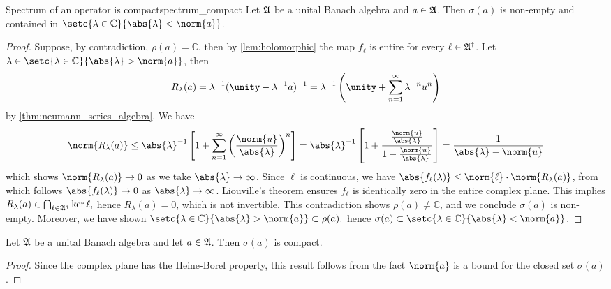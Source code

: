 \begin{theorem}{Spectrum of an operator is compact}{spectrum_compact}
    Let \(\mathfrak{A}\) be a unital Banach algebra and \(a \in \mathfrak{A}\). Then \(\sigma(a)\) is non-empty and contained in \(\setc{\lambda \in \mathbb{C}}{\abs{\lambda} < \norm{a}}\).
\end{theorem}
\begin{proof}
    Suppose, by contradiction, \(\rho(a) = \mathbb{C}\), then by \cref{lem:holomorphic} the map \(f_\ell\) is entire for every \(\ell \in \mathfrak{A}^\dag\). Let \(\lambda \in \setc{\lambda \in \mathbb{C}}{\abs{\lambda} > \norm{a}}\), then
    \begin{equation*}
        R_{\lambda}(a) = \lambda^{-1}(\unity - \lambda^{-1}a)^{-1} = \lambda^{-1}\left(\unity + \sum_{n = 1}^{\infty} \lambda^{-n}u^n\right)
    \end{equation*}
    by \cref{thm:neumann_series_algebra}. We have
    \begin{equation*}
        \norm{R_{\lambda}(a)} \leq \abs{\lambda}^{-1}\left[1 + \sum_{n = 1}^\infty \left(\frac{\norm{u}}{\abs{\lambda}}\right)^n\right] = \abs{\lambda}^{-1} \left[1 + \frac{\frac{\norm{u}}{\abs{\lambda}}}{1 - \frac{\norm{u}}{\abs{\lambda}}}\right] = \frac{1}{\abs{\lambda} - \norm{u}}
    \end{equation*}
    which shows \(\norm{R_{\lambda}(a)} \to 0\) as we take \(\abs{\lambda} \to \infty\). Since \(\ell\) is continuous, we have \(\abs{f_\ell(\lambda)} \leq \norm{\ell}\cdot \norm{R_{\lambda}(a)}\), from which follows \(\abs{f_\ell(\lambda)} \to 0\) as \(\abs{\lambda} \to \infty\). Liouville's theorem ensures \(f_\ell\) is identically zero in the entire complex plane. This implies \(R_\lambda(a) \in \bigcap_{\ell \in \mathfrak{A}^\dag}\ker{\ell},\) hence \(R_{\lambda}(a) = 0\), which is not invertible. This contradiction shows \(\rho(a) \neq \mathbb{C}\), and we conclude \(\sigma(a)\) is non-empty. Moreover, we have shown \(\setc{\lambda \in \mathbb{C}}{\abs{\lambda} > \norm{a}} \subset \rho(a),\) hence \(\sigma(a) \subset \setc{\lambda \in \mathbb{C}}{\abs{\lambda} < \norm{a}}\).
\end{proof}
\begin{corollary}
    Let \(\mathfrak{A}\) be a unital Banach algebra and let \(a \in \mathfrak{A}\). Then \(\sigma(a)\) is compact.
\end{corollary}
\begin{proof}
    Since the complex plane has the Heine-Borel property, this result follows from the fact \(\norm{a}\) is a bound for the closed set \(\sigma(a)\).
\end{proof}

